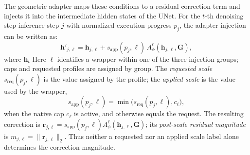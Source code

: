 \documentclass[times,twocolumn,final]{elsarticle}
\providecommand{\DIFadd}[1]{{\protect\color{blue} \sf #1}} %
\providecommand{\DIFdel}[1]{{\protect\color{red} \scriptsize #1}} %
\providecommand{\DIFaddbegin}{} %
\providecommand{\DIFaddend}{} %
\providecommand{\DIFdelbegin}{} %
\providecommand{\DIFdelend}{} %
\begin{document}
The geometric adapter maps these conditions to a residual correction term and injects it into the intermediate hidden states of the UNet. For \DIFdelbegin \DIFdel{the $t$-th denoising step }\DIFdelend \DIFaddbegin \DIFadd{inference step $j$ with normalized execution progress $p_j$}\DIFaddend , the adapter injection can be written as:
\DIFdelbegin %
\DIFdelend \DIFaddbegin \begin{equation}
\mathbf{h}'_{j,\ell} = \mathbf{h}_{j,\ell} + s_{\mathrm{app}}(p_j,\ell)\, A^\ell_\phi(\mathbf{h}_{j,\ell}, \mathbf{G}),
\label{eq:injection}
\end{equation}\DIFaddend 
\DIFdelbegin \DIFdel{where $\mathbf{h}_t$ }\DIFdelend \DIFaddbegin \DIFadd{Here $\ell$ identifies a wrapper within one of the three injection groups; caps and requested profiles are assigned by group. The \emph{requested scale} $s_{\mathrm{req}}(p_j,\ell)$ is the value assigned by the profile; the \emph{applied scale} is the value used by the wrapper,
}\begin{equation}
s_{\mathrm{app}}(p_j,\ell)=\min\!\bigl(s_{\mathrm{req}}(p_j,\ell),c_\ell\bigr),
\end{equation}
\DIFadd{when the native cap $c_\ell$ is active, and otherwise equals the request. The resulting correction is $\mathbf{r}_{j,\ell}=s_{\mathrm{app}}(p_j,\ell)A^\ell_\phi(\mathbf{h}_{j,\ell},\mathbf{G})$; its \emph{post-scale residual magnitude} is $m_{j,\ell}=\|\mathbf{r}_{j,\ell}\|_2$. Thus neither a requested nor an applied scale label alone determines the correction magnitude.
}
\end{document}
